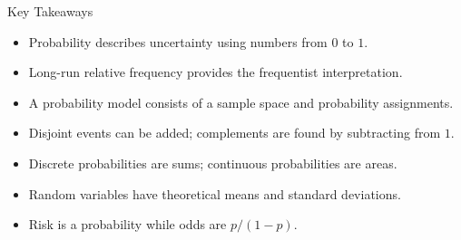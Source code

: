\documentclass[aspectratio=169]{beamer}
\begin{document}
%

\begin{frame}{Key Takeaways}
\begin{itemize}
  \item Probability describes uncertainty using numbers from $0$ to $1$.
  \item Long-run relative frequency provides the frequentist interpretation.
  \item A probability model consists of a sample space and probability assignments.
  \item Disjoint events can be added; complements are found by subtracting from $1$.
  \item Discrete probabilities are sums; continuous probabilities are areas.
  \item Random variables have theoretical means and standard deviations.
  \item Risk is a probability while odds are $p/(1-p)$.
\end{itemize}
\end{frame}
\end{document}
